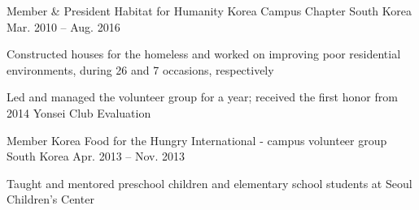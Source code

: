 


\begin{cventries}


\cventry
{Member \& President} %
{Habitat for Humanity Korea Campus Chapter} %
{South Korea} %
{Mar. 2010 – Aug. 2016} %
{ %
\begin{cvitems}
\item {Constructed houses for the homeless and worked on improving poor residential environments, during 26 and 7 occasions, respectively}
\item {Led and managed the volunteer group for a year; received the first honor from 2014 Yonsei Club Evaluation}
\end{cvitems}
}


\cventry
{Member} %
{Korea Food for the Hungry International - campus volunteer group} %
{South Korea} %
{Apr. 2013 – Nov. 2013} %
{ %
\begin{cvitems}
\item {Taught and mentored preschool children and elementary school students at Seoul Children’s Center}
\end{cvitems}
}


\end{cventries}